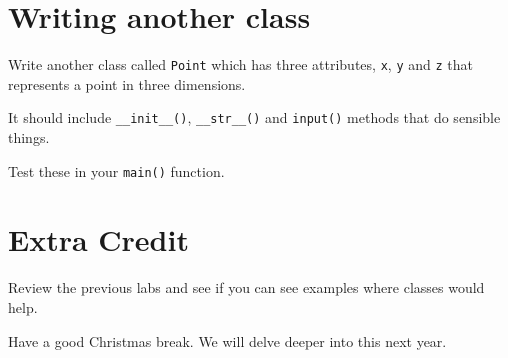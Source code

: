 \documentclass[12pt,oneside]{cttutorial}
\begin{document}
\section{Writing another class}

Write another class called \lstinline!Point! which has three attributes, \lstinline!x!, \lstinline!y! and \lstinline!z! that represents a point in three dimensions.

It should include \lstinline!__init__()!, \lstinline!__str__()! and \lstinline!input()! methods that do sensible things.

Test these in your \lstinline!main()! function.

\section{Extra Credit}

Review the previous labs and see if you can see examples where classes would help.

Have a good Christmas break. We will delve deeper into this next year.
\end{document}
